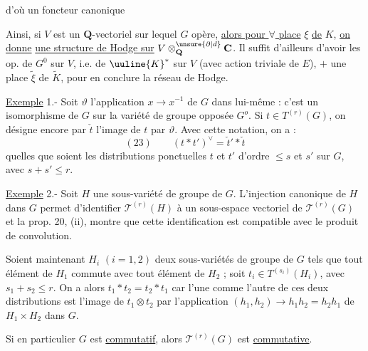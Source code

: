 d'où un foncteur canonique

 Ainsi, si $V$ est un  $\mathbf Q$-vectoriel sur lequel $G$ opère, \uline{alors pour $\forall$ place} $\xi$ \uline{de} $K$, \uline{on donne} \uline{une structure de Hodge sur} $V\otimes_{\mathbf Q}^{\unsure{\partial|d}}\mathbf C$. Il suffit d'ailleurs d'avoir les op. de $G^0$ sur $V$, i.e. de $\uuline{K}^*$ sur $V$ (avec action triviale de $E$), $+$ une place $\widetilde\xi$ de \textcircled{$\widetilde K$}, pour en conclure la  réseau de Hodge.


\uline{Exemple} 1.- Soit $\vartheta$ l'application $x\longrightarrow x^{-1}$ de $G$ dans lui-même : c'est un isomorphisme de $G$ sur la variété de groupe opposée $G^o$. Si $t\in T^{(r)}(G)$, on désigne encore par $\check t$ l'image de $t$ par $\vartheta$. Avec cette notation, on a :
\[
(23)\qquad (t*t')^\vee=\check t'*\check t
\]
quelles que soient les distributions ponctuelles $t$ et $t'$ d'ordre $\leq s$ et $s'$ sur $G$, avec $s+s'\leq r$.

\uline{Exemple} 2.- Soit $H$ une sous-variété de groupe de $G$. L'injection canonique de $H$ dans $G$ permet d'identifier $\mathcal T^{(r)}(H)$ à un sous-espace vectoriel de $\mathcal T^{(r)}(G)$ et la prop. 20, (ii), montre que cette identification est compatible avec le produit de convolution.

Soient maintenant $H_i$ $(i=1,2)$ deux sous-variétés de groupe de $G$ tels que tout élément de $H_1$ commute avec tout élément de $H_2$ ; soit $t_i\in T^{(s_i)}(H_i)$, avec $s_1+s_2\leq r$. On a alors $t_1*t_2=t_2*t_1$ car l'une comme l'autre de ces deux distributions est l'image de $t_1\otimes t_2$ par l'application $(h_1,h_2)\longrightarrow h_1h_2=h_2h_1$ de $H_1\times H_2$ dans $G$.

Si en particulier $G$ est \uline{commutatif}, alors $\mathcal T^{(r)}(G)$ est \uline{commutative}.

